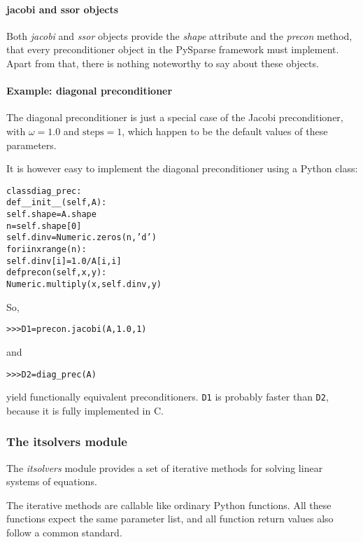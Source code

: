 \documentclass[a4paper]{article}
\newlength{\pyindent} \newlength{\pyminipagewidth}
\newenvironment{pycode}{\begin{trivlist}\item\hspace*{\pyindent}\begin{minipage}{\pyminipagewidth}\small\begin{alltt}}
      {\end{alltt}\end{minipage}\end{trivlist}}
\newenvironment{pyinline}{\begin{trivlist}\item\hspace*{\pyindent}\begin{minipage}{\pyminipagewidth}\small\begin{alltt}}
      {\end{alltt}\end{minipage}\end{trivlist}}
\begin{document}
\paragraph{jacobi and ssor objects}
%
Both \textit{jacobi} and \textit{ssor} objects provide the
\textit{shape} attribute and the \textit{precon} method, that every
preconditioner object in the PySparse framework must implement.  Apart
from that, there is nothing noteworthy to say about these objects.

\paragraph{Example: diagonal preconditioner}
%
The diagonal preconditioner is just a special case of the Jacobi
preconditioner, with $\omega=1.0$ and $\text{steps}=1$, which happen
to be the default values of these parameters.

It is however easy to implement the diagonal preconditioner using a
Python class:
\begin{pycode}
class diag_prec:
    def __init__(self, A):
        self.shape = A.shape
        n = self.shape[0]
        self.dinv = Numeric.zeros(n, 'd')
        for i in xrange(n):
            self.dinv[i] = 1.0 / A[i,i]
    def precon(self, x, y):
        Numeric.multiply(x, self.dinv, y)
\end{pycode}
So,
\begin{pyinline}
>>> D1 = precon.jacobi(A, 1.0, 1)
\end{pyinline}
and
\begin{pyinline}
>>> D2 = diag_prec(A)
\end{pyinline}
yield functionally equivalent preconditioners. \texttt{D1} is probably
faster than \texttt{D2}, because it is fully implemented in C.

\subsubsection{The itsolvers module}
\label{sec:python:itsolvers}
%
The \textit{itsolvers} module provides a set of iterative methods for
solving linear systems of equations.

The iterative methods are callable like ordinary Python functions. All
these functions expect the same parameter list, and all function
return values also follow a common standard.
\end{document}
